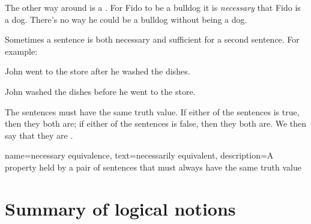 
The other way around is a . For Fido to be a bulldog it is \emph{necessary} that Fido is a dog. There's no way he could be a bulldog without being a dog. 





Sometimes a sentence is both necessary and sufficient for a second sentence. For example:
\begin{earg}
\item[] John went to the store after he washed the dishes.
\item[] John washed the dishes before he went to the store.
\end{earg}
The sentences must have the same truth value. 
 If either of the sentences is true, then they both are; if either of the sentences is false, then they both are. We then say that they are .


{
name={necessary equivalence},
text={necessarily equivalent},
description={A property held by a pair of sentences that must always have the same truth value}
}




\section*{Summary of logical notions}

